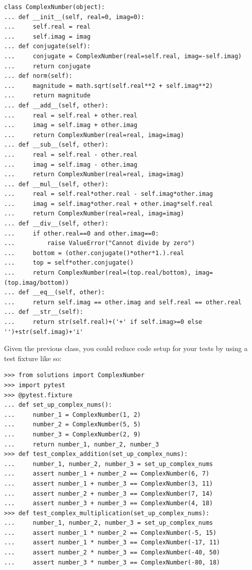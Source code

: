\begin{lstlisting}
class ComplexNumber(object):
... def __init__(self, real=0, imag=0):
...     self.real = real
...     self.imag = imag
... def conjugate(self):
...     conjugate = ComplexNumber(real=self.real, imag=-self.imag)
...     return conjugate
... def norm(self):
...     magnitude = math.sqrt(self.real**2 + self.imag**2)
...     return magnitude
... def __add__(self, other):
...     real = self.real + other.real
...     imag = self.imag + other.imag
...     return ComplexNumber(real=real, imag=imag)
... def __sub__(self, other):
...     real = self.real - other.real
...     imag = self.imag - other.imag
...     return ComplexNumber(real=real, imag=imag)
... def __mul__(self, other):
...     real = self.real*other.real - self.imag*other.imag
...     imag = self.imag*other.real + other.imag*self.real
...     return ComplexNumber(real=real, imag=imag)
... def __div__(self, other):
...     if other.real==0 and other.imag==0:
...         raise ValueError("Cannot divide by zero")
...     bottom = (other.conjugate()*other*1.).real
...     top = self*other.conjugate()
...     return ComplexNumber(real=(top.real/bottom), imag=(top.imag/bottom))
... def __eq__(self, other):
...     return self.imag == other.imag and self.real == other.real
... def __str__(self):
...     return str(self.real)+('+' if self.imag>=0 else '')+str(self.imag)+'i'
\end{lstlisting}
Given the previous class, you could reduce code setup for your tests by using a test fixture like so:
\begin{lstlisting}
>>> from solutions import ComplexNumber
>>> import pytest
>>> @pytest.fixture
... def set_up_complex_nums():
...     number_1 = ComplexNumber(1, 2)
...     number_2 = ComplexNumber(5, 5)
...     number_3 = ComplexNumber(2, 9)
...     return number_1, number_2, number_3
>>> def test_complex_addition(set_up_complex_nums):
...     number_1, number_2, number_3 = set_up_complex_nums
...     assert number_1 + number_2 == ComplexNumber(6, 7)
...     assert number_1 + number_3 == ComplexNumber(3, 11)
...     assert number_2 + number_3 == ComplexNumber(7, 14)
...     assert number_3 + number_3 == ComplexNumber(4, 18)
>>> def test_complex_multiplication(set_up_complex_nums):
...     number_1, number_2, number_3 = set_up_complex_nums
...     assert number_1 * number_2 == ComplexNumber(-5, 15)
...     assert number_1 * number_3 == ComplexNumber(-17, 11)
...     assert number_2 * number_3 == ComplexNumber(-40, 50)
...     assert number_3 * number_3 == ComplexNumber(-80, 18)
\end{lstlisting}

